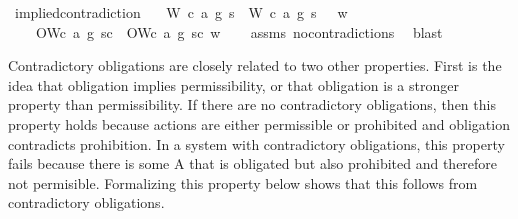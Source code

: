 \begin{isabellebody}
{}%
\endisatagproof
{\isafoldproof}%
%
\isadelimproof
\isanewline
%
\endisadelimproof
\isanewline
{}\isamarkupfalse%
\ implied{\isacharunderscore}contradiction{\isacharcolon}\isanewline
\ \ \ {\isachardoublequoteopen}{\isacharparenleft}{\isacharparenleft}{\isacharparenleft}W\ {\isacharparenleft}c{}{\isacharcomma}\ a{}{\isacharcomma}\ g{}{\isacharparenright}\ s{\isacharparenright}\ \isactrlbold {\isasymand}\ {\isacharparenleft}W\ {\isacharparenleft}c{}{\isacharcomma}\ a{}{\isacharcomma}\ g{}{\isacharparenright}\ s{\isacharparenright}{\isacharparenright}\ \isactrlbold {\isasymrightarrow}\ \isactrlbold {\isasymbottom}{\isacharparenright}\ w{\isachardoublequoteclose}\isanewline
\ \ \ {\isachardoublequoteopen}\isactrlbold {\isasymnot}\ {\isacharparenleft}O{\isacharbraceleft}W{\isacharparenleft}c{}{\isacharcomma}\ a{}{\isacharcomma}\ g{}{\isacharparenright}\ s{\isacharbar}c{\isacharbraceright}\ \isactrlbold {\isasymand}\ O{\isacharbraceleft}W{\isacharparenleft}c{}{\isacharcomma}\ a{}{\isacharcomma}\ g{}{\isacharparenright}\ s{\isacharbar}c{\isacharbraceright}{\isacharparenright}\ w{\isachardoublequoteclose}\isanewline
%
\isadelimproof
\ \ %
\endisadelimproof
%
\isatagproof
{}\isamarkupfalse%
\ assms\ no{\isacharunderscore}contradictions\ \isamarkupfalse%
\ blast\isanewline
%
%
\endisatagproof
{\isafoldproof}%
%
\isadelimproof
%
\endisadelimproof
%
\begin{isamarkuptext}%
Contradictory obligations are closely related to two other properties. First is the idea that obligation implies permissibility, or 
that obligation is a stronger property than permissibility. If there are no contradictory obligations, 
then this property holds because actions are either permissible or prohibited and obligation contradicts
prohibition. In a system with contradictory obligations, this property fails because there is some
A that is obligated but also prohibited and therefore not permisible. Formalizing this property below shows 
that this follows from contradictory obligations.


\end{isamarkuptext}
\end{isabellebody}
